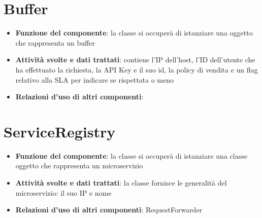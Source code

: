 \chapter{Buffer}
\begin{itemize}
	\item \textbf{Funzione del componente}: la classe si occuper\`{a} di istanziare una oggetto che rappresenta un buffer 
	\item \textbf{Attivit\`{a} svolte e dati trattati}: contiene l'IP dell'host, l'ID dell'utente che ha effettuato la richiesta, la API Key e il suo id, la policy di vendita e un flag relativo alla SLA per indicare se rispettata o meno
	\item \textbf{Relazioni d'uso di altri componenti}: 
\end{itemize}

\chapter{ServiceRegistry}
\begin{itemize}
	\item \textbf{Funzione del componente}: la classe si occuper\`{a} di istanziare una classe oggetto che rappresenta un microservizio
	\item \textbf{Attivit\`{a} svolte e dati trattati}: la classe fornisce le generalit\`{a} del microservizio: il suo IP e nome
	\item \textbf{Relazioni d'uso di altri componenti}: RequestForwarder
\end{itemize}





